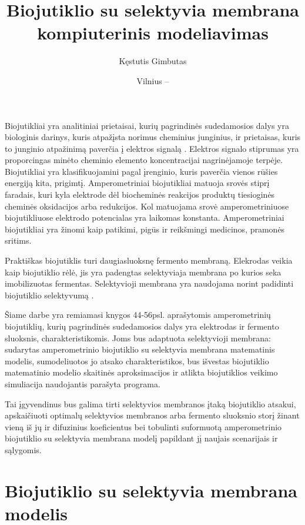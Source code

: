 \documentclass[12pt, a4paper, lithuanian]{article}
\title{Biojutiklio su selektyvia membrana kompiuterinis modeliavimas}
\author{
   Kęstutis Gimbutas
}
\date{Vilnius – \the\year}
\begin{document}
\sloppy
\maketitle

\tableofcontents

Biojutikliai yra analitiniai prietaisai, kurių pagrindinės sudedamosios dalys
yra biologinis darinys, kuris atpažįsta norimus cheminius junginius, ir
prietaisas, kuris to junginio atpažinimą  paverčia į elektros signalą \cite{baronas2009mathematical}. Elektros
signalo stiprumas yra proporcingas minėto cheminio elemento koncentracijai
nagrinėjamoje terpėje. Biojutikliai yra klasifikuojamini pagal įrenginio, kuris
paverčia vienos rūšies energiją kita,
prigimtį. Amperometriniai biojutikliai matuoja srovės stiprį faradais, kuri
kyla elektrode dėl biocheminės reakcijos produktų tiesioginės cheminės oksidacijos 
arba redukcijos. Kol matuojama srovė amperometriniuose biojutikliuose elektrodo potencialas yra
laikomas konstanta. Amperometriniai biojutikliai yra žinomi
kaip patikimi, pigūs ir reikšmingi medicinos, pramonės sritims.

Praktiškas biojutiklis turi daugiasluoksnę fermento membraną. Elekrodas veikia
kaip biojutiklio rėlė, jis yra padengtas selektyviaja membrana po kurios seka
imobilizuotas fermentas. Selektyvioji membrana yra naudojama norint padidinti
biojutiklio selektyvumą \cite{baronas2006computational}.

Šiame darbe yra remiamasi \cite{baronas2009mathematical} knygos 44-56psl.
aprašytomis amperometrinių biojutiklių, kurių pagrindinės sudedamosios dalys
yra elektrodas ir fermento sluoksnis, charakteristikomis. Joms bus adaptuota
selektyvioji membrana: sudarytas amperometrinio biojutiklio su selektyvia
membrana matematinis modelis, sumodeliuotos jo atsako charakteristikos, bus
išvestas biojutiklio matematinio modelio skaitinės aproksimacijos ir atlikta
biojutiklios veikimo simuliacija naudojantis parašyta programa.

Tai įgyvendinus bus galima tirti selektyvios membranos įtaką biojutiklio
atsakui, apskaičiuoti optimalų selektyvios membranos arba fermento sluoksnio
storį žinant vieną iš jų ir difuzinius koeficientus bei tobulinti suformuotą
amperometrinio biojutiklio su selektyvia membrana modelį papildant jį naujais
scenarijais ir sąlygomis.

\section{Biojutiklio su selektyvia membrana modelis}
\end{document}

